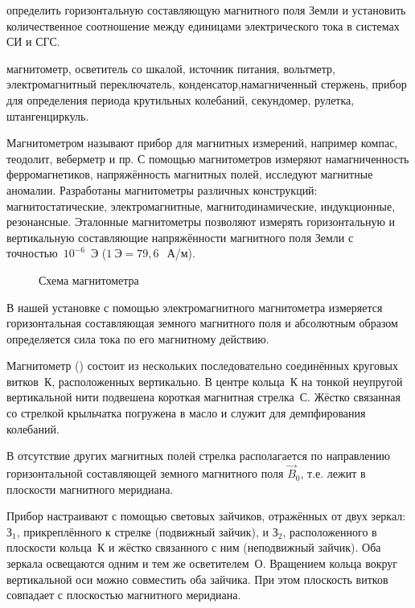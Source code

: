
\begin{lab:aim}
    определить горизонтальную составляющую магнитного поля Земли и установить количественное соотношение между единицами электрического тока в системах СИ и СГС.
\end{lab:aim}

\begin{lab:equipment}
    магнитометр, осветитель со шкалой, источник питания, вольтметр, электромагнитный переключатель, конденсатор,намагниченный стержень, прибор для определения периода крутильных колебаний, секундомер, рулетка, штангенциркуль.
\end{lab:equipment}


Магнитометром называют прибор для магнитных измерений, например компас, теодолит, веберметр и пр. С помощью
магнитометров измеряют намагниченность ферромагнетиков, напряжённость магнитных полей, исследуют магнитные аномалии.
Разработаны магнитометры различных конструкций: магнитостатические, электромагнитные, магнитодинамические, индукционные,
резонансные. Эталонные магнитометры позволяют измерять горизонтальную и вертикальную составляющие напряжённости
магнитного поля Земли с точностью~$10^{-6}$~Э ($1~Э=79,6~$~А/м).

\begin{wrapfigure}{r}{0.4\textwidth}
	\caption{Схема магнитометра}
\end{wrapfigure}

В нашей установке с помощью электромагнитного магнитометра измеряется горизонтальная составляющая земного магнитного
поля и абсолютным образом определяется сила тока по его магнитному действию.

\experiment Магнитометр () состоит из нескольких последовательно соединённых круговых витков~К, расположенных
вертикально. В центре кольца~К на тонкой неупругой вертикальной нити подвешена короткая магнитная стрелка~С. Жёстко
связанная со стрелкой крыльчатка погружена в масло и служит для демпфирования колебаний.

В отсутствие других магнитных полей стрелка располагается по направлению горизонтальной составляющей земного магнитного
поля $\vec{B}_0$, т.е. лежит в плоскости магнитного меридиана.

Прибор настраивают с помощью световых зайчиков, отражённых от двух зеркал: $З_1$, прикреплённого к стрелке (подвижный
зайчик), и $З_2$, расположенного в плоскости кольца~К и жёстко связанного с ним (неподвижный зайчик). Оба зеркала
освещаются одним и тем же осветителем~О. Вращением кольца вокруг вертикальной оси можно совместить оба зайчика. При этом
плоскость витков совпадает с плоскостью магнитного меридиана.

